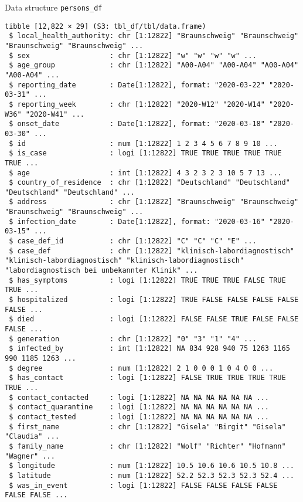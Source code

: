 \documentclass[
  8pt,
  ignorenonframetext,
]{beamer}
\begin{document}
\begin{frame}[fragile]{Data structure}
\protect\hypertarget{data-structure}{}
\texttt{persons\_df}

\vspace{0.2cm}

\tiny

\begin{verbatim}
tibble [12,822 × 29] (S3: tbl_df/tbl/data.frame)
 $ local_health_authority: chr [1:12822] "Braunschweig" "Braunschweig" "Braunschweig" "Braunschweig" ...
 $ sex                   : chr [1:12822] "w" "w" "w" "w" ...
 $ age_group             : chr [1:12822] "A00-A04" "A00-A04" "A00-A04" "A00-A04" ...
 $ reporting_date        : Date[1:12822], format: "2020-03-22" "2020-03-31" ...
 $ reporting_week        : chr [1:12822] "2020-W12" "2020-W14" "2020-W36" "2020-W41" ...
 $ onset_date            : Date[1:12822], format: "2020-03-18" "2020-03-30" ...
 $ id                    : num [1:12822] 1 2 3 4 5 6 7 8 9 10 ...
 $ is_case               : logi [1:12822] TRUE TRUE TRUE TRUE TRUE TRUE ...
 $ age                   : int [1:12822] 4 3 2 3 2 3 10 5 7 13 ...
 $ country_of_residence  : chr [1:12822] "Deutschland" "Deutschland" "Deutschland" "Deutschland" ...
 $ address               : chr [1:12822] "Braunschweig" "Braunschweig" "Braunschweig" "Braunschweig" ...
 $ infection_date        : Date[1:12822], format: "2020-03-16" "2020-03-15" ...
 $ case_def_id           : chr [1:12822] "C" "C" "C" "E" ...
 $ case_def              : chr [1:12822] "klinisch-labordiagnostisch" "klinisch-labordiagnostisch" "klinisch-labordiagnostisch" "labordiagnostisch bei unbekannter Klinik" ...
 $ has_symptoms          : logi [1:12822] TRUE TRUE TRUE FALSE TRUE TRUE ...
 $ hospitalized          : logi [1:12822] TRUE FALSE FALSE FALSE FALSE FALSE ...
 $ died                  : logi [1:12822] FALSE FALSE TRUE FALSE FALSE FALSE ...
 $ generation            : chr [1:12822] "0" "3" "1" "4" ...
 $ infected_by           : int [1:12822] NA 834 928 940 75 1263 1165 990 1185 1263 ...
 $ degree                : num [1:12822] 2 1 0 0 0 1 0 4 0 0 ...
 $ has_contact           : logi [1:12822] FALSE TRUE TRUE TRUE TRUE TRUE ...
 $ contact_contacted     : logi [1:12822] NA NA NA NA NA NA ...
 $ contact_quarantine    : logi [1:12822] NA NA NA NA NA NA ...
 $ contact_tested        : logi [1:12822] NA NA NA NA NA NA ...
 $ first_name            : chr [1:12822] "Gisela" "Birgit" "Gisela" "Claudia" ...
 $ family_name           : chr [1:12822] "Wolf" "Richter" "Hofmann" "Wagner" ...
 $ longitude             : num [1:12822] 10.5 10.6 10.6 10.5 10.8 ...
 $ latitude              : num [1:12822] 52.2 52.3 52.3 52.3 52.4 ...
 $ was_in_event          : logi [1:12822] FALSE FALSE FALSE FALSE FALSE FALSE ...
\end{verbatim}

\normalsize
\end{frame}
\end{document}

